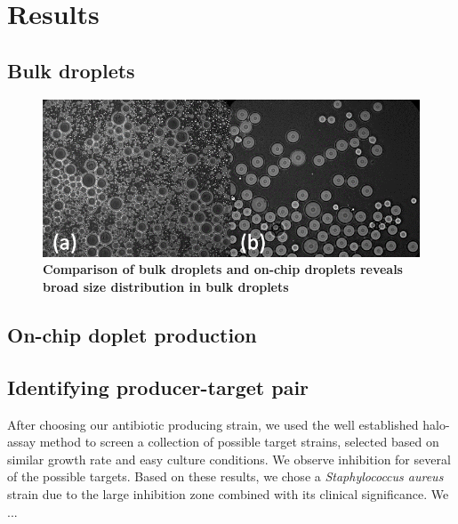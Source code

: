 \chapter{Results}

\section{Bulk droplets}

\begin{figure}
\centering
\includegraphics[width=\linewidth]{graphics/2025_09_28_droplets_fig3.png}
\caption{\textbf{Comparison of bulk droplets and on-chip droplets reveals broad size distribution in bulk droplets}}
\label{fig:results_droplet_bulk_vs_chip}
\end{figure}

\section{On-chip doplet production}

\section{Identifying producer-target pair}
After choosing our antibiotic producing strain, we used the well established halo-assay method to screen a collection of possible target strains, selected based on similar growth rate and easy culture conditions. We observe inhibition for several of the possible targets. Based on these results, we chose a \textit{Staphylococcus aureus} strain due to the large inhibition zone combined with its clinical significance. We ...

